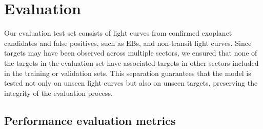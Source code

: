 
\section{Evaluation}
\label{sec:model_analysis}

Our evaluation test set consists of light curves from confirmed exoplanet candidates and false positives, such as EBs, and non-transit light curves. Since targets may have been observed across multiple sectors, we ensured that none of the targets in the evaluation set have associated targets in other sectors included in the training or validation sets. This separation guarantees that the model is tested not only on unseen light curves but also on unseen targets, preserving the integrity of the evaluation process. \par






\subsection{Performance evaluation metrics}
\label{sec:performancemetrics}



